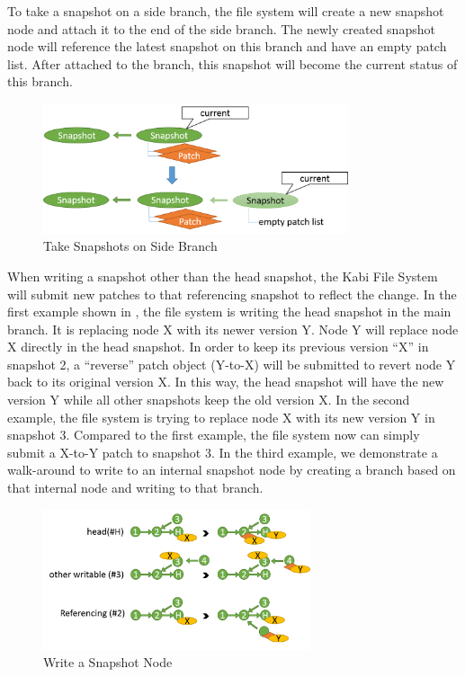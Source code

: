 	To take a snapshot on a side branch, the file system will create a new snapshot node and attach it to the end of the side branch. The newly created snapshot node will reference the latest snapshot on this branch and have an empty patch list. After attached to the branch, this snapshot will become the current status of this branch.

\begin{figure}[t]
\centering
\includegraphics[width=0.8\textwidth]{Chapter-4/figs/fig21.png}
\caption{Take Snapshots on Side Branch}
\label{fig:take_snapshot_nonroot}
\end{figure}
    
    When writing a snapshot other than the head snapshot, the Kabi File System will submit new patches to that referencing snapshot to reflect the change. In the first example shown in , the file system is writing the head snapshot in the main branch. It is replacing node X with its newer version Y. Node Y will replace node X directly in the head snapshot. In order to keep its previous version ``X'' in snapshot 2, a ``reverse'' patch object (Y-to-X) will be submitted to revert node Y back to its original version X. In this way, the head snapshot will have the new version Y while all other snapshots keep the old version X. In the second example, the file system is trying to replace node X with its new version Y in snapshot 3. Compared to the first example, the file system now can simply submit a X-to-Y patch to snapshot 3. In the third example, we demonstrate a walk-around to write to an internal snapshot node by creating a branch based on that internal node and writing to that branch.

\begin{figure}[t]
\centering
\includegraphics[width=0.7\textwidth]{Chapter-4/figs/fig17.png}
\caption{Write a Snapshot Node}
\label{fig:write_snapshot_node}
\end{figure}

